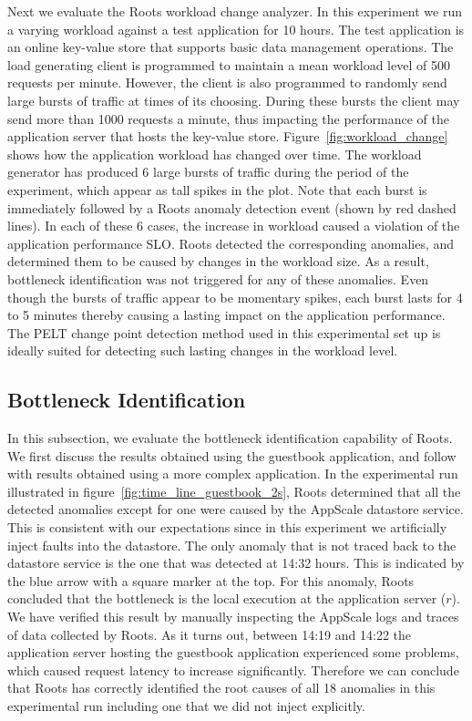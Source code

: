 Next we evaluate the Roots workload change analyzer. In this experiment we run a varying workload
against a test application for 10 hours. The test application is an online key-value store that supports
basic data management operations. The load generating client is programmed
to maintain a mean workload level of 500 requests per minute. However, the client
is also programmed to randomly send large bursts of traffic at times of its choosing. During these bursts 
the client may send more than 1000 requests a minute, thus impacting the performance of
the application server that hosts the key-value store. Figure~\ref{fig:workload_change} shows how
the application workload has changed over time. The workload generator has produced 6 large bursts of traffic during the 
period of the experiment, which appear as tall spikes in the plot.
Note that each burst is immediately followed by a Roots anomaly detection event (shown by red dashed lines). 
In each of these 6 cases, the increase in workload caused a violation of the application performance SLO.
Roots detected the corresponding anomalies, and determined them to be caused by changes in the workload size.
As a result, bottleneck identification was not triggered for any of these anomalies.
Even though the bursts of traffic appear to be momentary
spikes, each burst lasts for 4 to 5 minutes thereby causing a lasting impact on the application performance.
The PELT change point detection method used in this experimental set up is ideally suited for detecting
such lasting changes in the workload level.

\subsection{Bottleneck Identification}

In this subsection, we evaluate the bottleneck identification capability of 
Roots. We first discuss the results obtained using
the guestbook application, and follow with
results obtained using a more complex application.
In the experimental run illustrated in 
figure~\ref{fig:time_line_guestbook_2s}, Roots determined that all the detected anomalies except for one were 
caused by the AppScale datastore service. This is consistent with our expectations since in this experiment we 
artificially inject faults into the datastore. 
The only anomaly that is not traced back to the datastore service is the one that was detected at 14:32 hours.
This is indicated by the blue arrow with a square marker at the top. For this anomaly, Roots concluded that
the bottleneck is the local execution at the application server ($r$). We have verified
this result by manually inspecting the AppScale logs and traces of data collected by Roots. As it turns out,
between 14:19 and
14:22 the application server hosting the guestbook application experienced some problems, which caused
request latency to increase significantly. Therefore we can conclude that Roots has correctly identified 
the root causes of all 18 anomalies in this experimental run
including one that we did not inject explicitly. 

